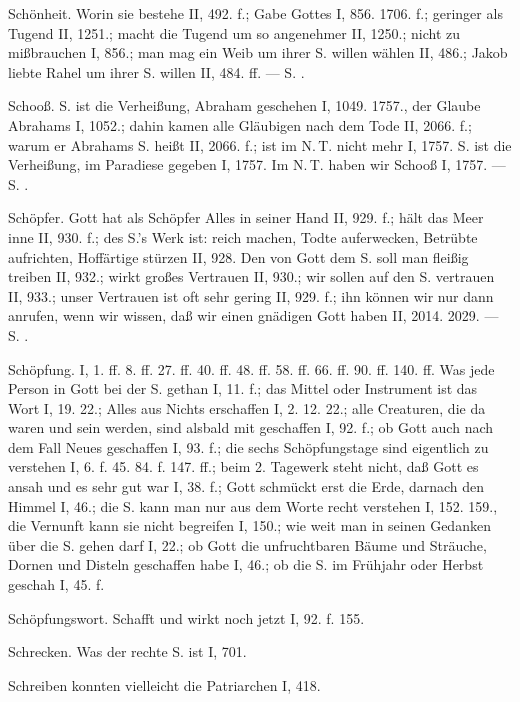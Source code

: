 Schönheit. Worin sie bestehe II, 492. f.; Gabe Gottes I, 856. 1706. f.; geringer als Tugend II, 1251.; macht die Tugend um so angenehmer II, 1250.; nicht zu mißbrauchen I, 856.; man mag ein Weib um ihrer S. willen wählen II, 486.; Jakob liebte Rahel um ihrer S. willen II, 484. ff. — S. .

Schooß.  S. ist die Verheißung, Abraham geschehen I, 1049. 1757., der Glaube Abrahams I, 1052.; dahin kamen alle Gläubigen nach dem Tode II, 2066. f.; warum er Abrahams S. heißt II, 2066. f.; ist im N.\,T. nicht mehr I, 1757.  S. ist die Verheißung, im Paradiese gegeben I, 1757. Im N.\,T. haben wir  Schooß I, 1757. — S. .

Schöpfer. Gott hat als Schöpfer Alles in seiner Hand II, 929. f.; hält das Meer inne II, 930. f.; des S.’s Werk ist: reich machen, Todte auferwecken, Betrübte aufrichten, Hoffärtige stürzen II, 928. Den  von Gott dem S. soll man fleißig treiben II, 932.; wirkt großes Vertrauen II, 930.; wir sollen auf den S. vertrauen II, 933.; unser Vertrauen ist oft sehr gering II, 929. f.; ihn können wir nur dann anrufen, wenn wir wissen, daß wir einen gnädigen Gott haben II, 2014. 2029. — S. .

Schöpfung. I, 1. ff. 8. ff. 27. ff. 40. ff. 48. ff. 58. ff. 66. ff. 90. ff. 140. ff. Was jede Person in Gott bei der S. gethan I, 11. f.; das Mittel oder Instrument ist das Wort I, 19. 22.; Alles aus Nichts erschaffen I, 2. 12. 22.; alle Creaturen, die da waren und sein werden, sind alsbald mit geschaffen I, 92. f.; ob Gott auch nach dem Fall Neues geschaffen I, 93. f.; die sechs Schöpfungstage sind eigentlich zu verstehen I, 6. f. 45. 84. f. 147. ff.; beim 2. Tagewerk steht nicht, daß Gott es ansah und es sehr gut war I, 38. f.; Gott schmückt erst die Erde, darnach den Himmel I, 46.; die S. kann man nur aus dem Worte recht verstehen I, 152. 159., die Vernunft kann sie nicht begreifen I, 150.; wie weit man in seinen Gedanken über die S. gehen darf I, 22.; ob Gott die unfruchtbaren Bäume und Sträuche, Dornen und Disteln geschaffen habe I, 46.; ob die S. im Frühjahr oder Herbst geschah I, 45. f.

Schöpfungswort. Schafft und wirkt noch jetzt I, 92. f. 155.

Schrecken. Was der rechte S. ist I, 701.

Schreiben konnten vielleicht die Patriarchen I, 418.

